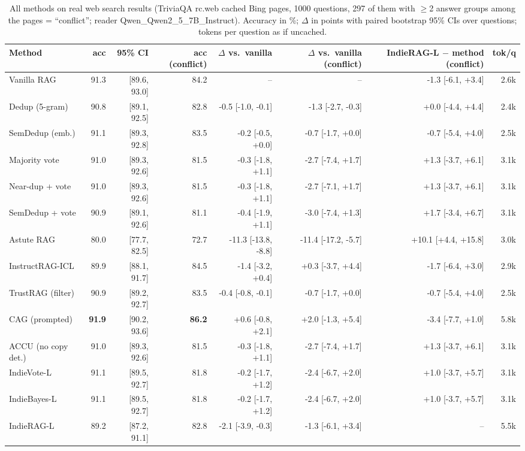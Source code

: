 \begin{table}[tbp]
\centering
\small
\caption{All methods on real web search results (TriviaQA rc.web cached Bing pages, 1000 questions, 297 of them with $\geq$2 answer groups among the pages = ``conflict''; reader Qwen\_Qwen2\_5\_7B\_Instruct). Accuracy in \%; $\Delta$ in points with paired bootstrap 95\% CIs over questions; tokens per question as if uncached.}
\label{tab:webmethods}
\setlength{\tabcolsep}{4pt}
\begin{tabular}{lrrrrrrr}
\toprule
Method & acc & 95\% CI & acc (conflict) & $\Delta$ vs.\ vanilla & $\Delta$ vs.\ vanilla (conflict) & IndieRAG-L $-$ method (conflict) & tok/q \\
\midrule
Vanilla RAG & 91.3 & [89.6, 93.0] & 84.2 & -- & -- & -1.3 [-6.1, +3.4] & 2.6k \\
Dedup (5-gram) & 90.8 & [89.1, 92.5] & 82.8 & -0.5 [-1.0, -0.1] & -1.3 [-2.7, -0.3] & +0.0 [-4.4, +4.4] & 2.4k \\
SemDedup (emb.) & 91.1 & [89.3, 92.8] & 83.5 & -0.2 [-0.5, +0.0] & -0.7 [-1.7, +0.0] & -0.7 [-5.4, +4.0] & 2.5k \\
Majority vote & 91.0 & [89.3, 92.6] & 81.5 & -0.3 [-1.8, +1.1] & -2.7 [-7.4, +1.7] & +1.3 [-3.7, +6.1] & 3.1k \\
Near-dup + vote & 91.0 & [89.3, 92.6] & 81.5 & -0.3 [-1.8, +1.1] & -2.7 [-7.1, +1.7] & +1.3 [-3.7, +6.1] & 3.1k \\
SemDedup + vote & 90.9 & [89.1, 92.6] & 81.1 & -0.4 [-1.9, +1.1] & -3.0 [-7.4, +1.3] & +1.7 [-3.4, +6.7] & 3.1k \\
Astute RAG & 80.0 & [77.7, 82.5] & 72.7 & -11.3 [-13.8, -8.8] & -11.4 [-17.2, -5.7] & +10.1 [+4.4, +15.8] & 3.0k \\
InstructRAG-ICL & 89.9 & [88.1, 91.7] & 84.5 & -1.4 [-3.2, +0.4] & +0.3 [-3.7, +4.4] & -1.7 [-6.4, +3.0] & 2.9k \\
TrustRAG (filter) & 90.9 & [89.2, 92.7] & 83.5 & -0.4 [-0.8, -0.1] & -0.7 [-1.7, +0.0] & -0.7 [-5.4, +4.0] & 2.5k \\
CAG (prompted) & \textbf{91.9} & [90.2, 93.6] & \textbf{86.2} & +0.6 [-0.8, +2.1] & +2.0 [-1.3, +5.4] & -3.4 [-7.7, +1.0] & 5.8k \\
ACCU (no copy det.) & 91.0 & [89.3, 92.6] & 81.5 & -0.3 [-1.8, +1.1] & -2.7 [-7.4, +1.7] & +1.3 [-3.7, +6.1] & 3.1k \\
\midrule
IndieVote-L & 91.1 & [89.5, 92.7] & 81.8 & -0.2 [-1.7, +1.2] & -2.4 [-6.7, +2.0] & +1.0 [-3.7, +5.7] & 3.1k \\
IndieBayes-L & 91.1 & [89.5, 92.7] & 81.8 & -0.2 [-1.7, +1.2] & -2.4 [-6.7, +2.0] & +1.0 [-3.7, +5.7] & 3.1k \\
IndieRAG-L & 89.2 & [87.2, 91.1] & 82.8 & -2.1 [-3.9, -0.3] & -1.3 [-6.1, +3.4] & -- & 5.5k \\
\bottomrule
\end{tabular}
\end{table}
